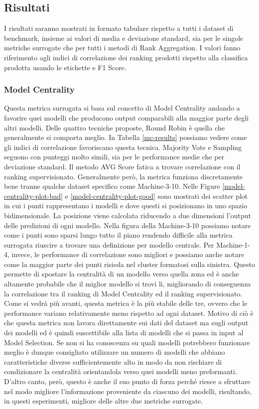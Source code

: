 \subsection{Risultati}
I risultati saranno mostrati in formato tabulare rispetto a tutti i dataset di benchmark, insieme ai valori di media e deviazione standard, sia per le singole metriche surrogate che per tutti i metodi di Rank Aggregation.
I valori fanno riferimento agli indici di correlazione dei ranking prodotti rispetto alla classifica prodotta usando le etichette e F1 Score.


\subsubsection{Model Centrality}
Questa metrica surrogata si basa sul concetto di Model Centrality andando a favorire quei modelli che producono output comparabili alla maggior parte degli altri modelli. Delle quattro tecniche proposte, Round Robin è quella che generalmente si comporta meglio. In Tabella \ref{mc-results} possiamo vedere come gli indici di correlazione favoriscano questa tecnica.
Majority Vote e Sampling seguono con punteggi molto simili, sia per le performance medie che per deviazione standard. Il metodo AVG Score fatica a trovare correlazione con il ranking supervisionato. 
Generalmente però, la metrica funziona discretamente bene tranne qualche dataset specifico come Machine-3-10.  Nelle Figure \ref{model-centrality-plot-bad} e \ref{model-centrality-plot-good} sono mostrati dei scatter plot in cui i punti rappresentano i modelli e dove questi si posizionano in uno spazio bidimensionale. La posizione viene calcolata riducendo a due dimensioni l'output delle predizioni di ogni modello.  Nella figura della Machine-3-10 possiamo notare come i punti sono sparsi lungo tutto il piano rendendo difficile alla metrica surrogata riuscire a trovare una definizione per modello centrale.
Per Machine-1-4, invece, le performance di correlazione sono migliori e possiamo anche notare come la maggior parte dei punti risieda nel cluster formatosi sulla sinistra. Questo permette di spostare la centralità di un modello verso quella zona ed è anche altamente probabile che il miglior modello si trovi li, migliorando di conseguenza la correlazione tra il ranking di Model Centrality ed il ranking supervisionato.
Come si vedrà più avanti, questa metrica è la più stabile delle tre, ovvero che le performance variano relativamente meno rispetto ad ogni dataset. Motivo di ciò è che questa metrica non lavora direttamente sui dati del dataset ma sugli output dei modelli ed è quindi suscettibile alla lista di modelli che si passa in input al Model Selection. Se non si ha conoscenza su quali modelli potrebbero funzionare meglio è dunque consigliato utilizzare un numero di modelli che abbiano caratteristiche diverse sufficientemente alto in modo da non rischiare di condizionare la centralità orientandola verso quei modelli meno preformanti.
D'altro canto, però, questo è anche il suo punto di forza perché riesce a sfruttare nel modo migliore l'informazione proveniente da ciascuno dei modelli, risultando, in questi esperimenti, migliore delle altre due metriche surrogate.

